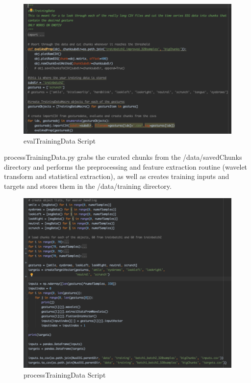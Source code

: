 \begin{figure}[H]
	\centering
		\includegraphics[width=1\columnwidth]{evalTrainingData.png}
	\caption{evalTrainingData Script}
	\label{fig:evalTrainingData}
\end{figure}  
 
\pagebreak
processTrainingData.py grabs the curated chunks from the /data/savedChunks directory and performs the preprocessing and feature extraction routine (wavelet transform and statistical extraction), as well as creates training inputs and targets and stores them in the /data/training directory.

\begin{figure}[H]
	\centering
		\includegraphics[width=1\columnwidth]{processTrainingData.png}
	\caption{processTrainingData Script}
	\label{fig:processTrainingData}
\end{figure}  
 \pagebreak

